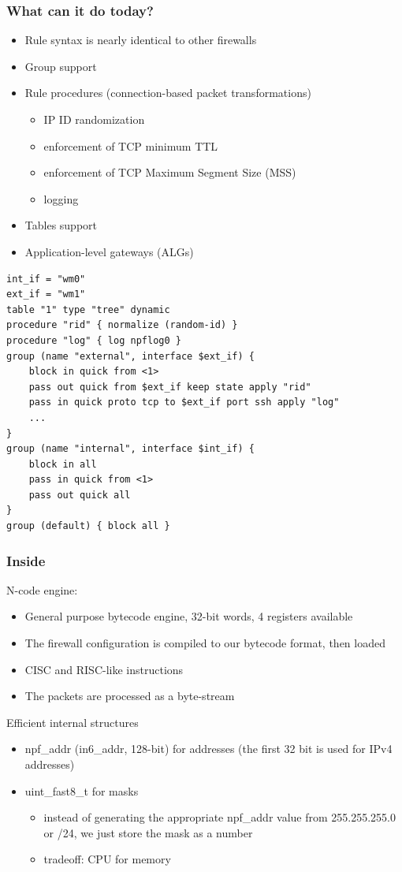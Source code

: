 \documentclass{beamer}
\begin{document}
\begin{frame}
\frametitle{What can it do today?}
\begin{itemize}
	\item Rule syntax is nearly identical to other firewalls
	\item Group support
	\item Rule procedures (connection-based packet transformations)
	\begin{itemize}
		\item IP ID randomization
		\item enforcement of TCP minimum TTL
		\item enforcement of TCP Maximum Segment Size (MSS)
		\item logging
	\end{itemize}
	\item Tables support
	\item Application-level gateways (ALGs)
\end{itemize}
\end{frame}

\begin{frame}[fragile,basicstyle=\ttfamily]
\begin{verbatim}
int_if = "wm0"
ext_if = "wm1"
table "1" type "tree" dynamic
procedure "rid" { normalize (random-id) }
procedure "log" { log npflog0 }
group (name "external", interface $ext_if) {
    block in quick from <1>
    pass out quick from $ext_if keep state apply "rid"
    pass in quick proto tcp to $ext_if port ssh apply "log"
    ...
}
group (name "internal", interface $int_if) {
    block in all
    pass in quick from <1>
    pass out quick all
}
group (default) { block all }
\end{verbatim}
\end{frame}

\begin{frame}
\frametitle{Inside}
N-code engine:
\begin{itemize}
	\item General purpose bytecode engine, 32-bit words, 4 registers available
	\item The firewall configuration is compiled to our bytecode format, then loaded
	\item CISC and RISC-like instructions
	\item The packets are processed as a byte-stream
\end{itemize}
Efficient internal structures
\begin{itemize}
	\item npf\_addr (in6\_addr, 128-bit) for addresses (the first 32 bit is used for IPv4 addresses)
	\item uint\_fast8\_t for masks
	\begin{itemize}
		\item instead of generating the appropriate npf\_addr value from  255.255.255.0 or /24, we just store
the mask as a number
		\item tradeoff: CPU for memory
	\end{itemize}
\end{itemize}
\end{frame}
\end{document}
